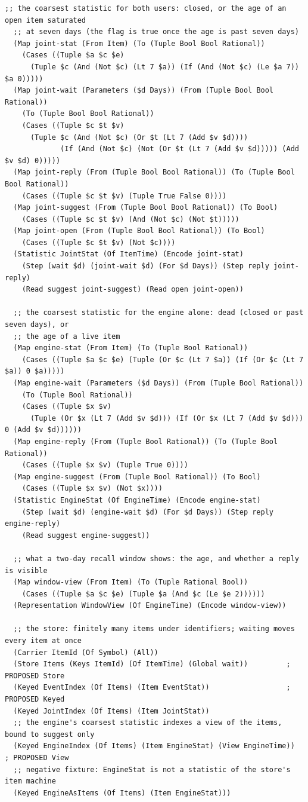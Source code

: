 \documentclass[11pt]{article}
\theoremstyle{definition}
\theoremstyle{plain}
\begin{document}
\begin{lstlisting}[style=mettamod]
  ;; the coarsest statistic for both users: closed, or the age of an open item saturated
  ;; at seven days (the flag is true once the age is past seven days)
  (Map joint-stat (From Item) (To (Tuple Bool Bool Rational))
    (Cases ((Tuple $a $c $e)
      (Tuple $c (And (Not $c) (Lt 7 $a)) (If (And (Not $c) (Le $a 7)) $a 0)))))
  (Map joint-wait (Parameters ($d Days)) (From (Tuple Bool Bool Rational))
    (To (Tuple Bool Bool Rational))
    (Cases ((Tuple $c $t $v)
      (Tuple $c (And (Not $c) (Or $t (Lt 7 (Add $v $d))))
             (If (And (Not $c) (Not (Or $t (Lt 7 (Add $v $d))))) (Add $v $d) 0)))))
  (Map joint-reply (From (Tuple Bool Bool Rational)) (To (Tuple Bool Bool Rational))
    (Cases ((Tuple $c $t $v) (Tuple True False 0))))
  (Map joint-suggest (From (Tuple Bool Bool Rational)) (To Bool)
    (Cases ((Tuple $c $t $v) (And (Not $c) (Not $t)))))
  (Map joint-open (From (Tuple Bool Bool Rational)) (To Bool)
    (Cases ((Tuple $c $t $v) (Not $c))))
  (Statistic JointStat (Of ItemTime) (Encode joint-stat)
    (Step (wait $d) (joint-wait $d) (For $d Days)) (Step reply joint-reply)
    (Read suggest joint-suggest) (Read open joint-open))

  ;; the coarsest statistic for the engine alone: dead (closed or past seven days), or
  ;; the age of a live item
  (Map engine-stat (From Item) (To (Tuple Bool Rational))
    (Cases ((Tuple $a $c $e) (Tuple (Or $c (Lt 7 $a)) (If (Or $c (Lt 7 $a)) 0 $a)))))
  (Map engine-wait (Parameters ($d Days)) (From (Tuple Bool Rational))
    (To (Tuple Bool Rational))
    (Cases ((Tuple $x $v)
      (Tuple (Or $x (Lt 7 (Add $v $d))) (If (Or $x (Lt 7 (Add $v $d))) 0 (Add $v $d))))))
  (Map engine-reply (From (Tuple Bool Rational)) (To (Tuple Bool Rational))
    (Cases ((Tuple $x $v) (Tuple True 0))))
  (Map engine-suggest (From (Tuple Bool Rational)) (To Bool)
    (Cases ((Tuple $x $v) (Not $x))))
  (Statistic EngineStat (Of EngineTime) (Encode engine-stat)
    (Step (wait $d) (engine-wait $d) (For $d Days)) (Step reply engine-reply)
    (Read suggest engine-suggest))

  ;; what a two-day recall window shows: the age, and whether a reply is visible
  (Map window-view (From Item) (To (Tuple Rational Bool))
    (Cases ((Tuple $a $c $e) (Tuple $a (And $c (Le $e 2))))))
  (Representation WindowView (Of EngineTime) (Encode window-view))

  ;; the store: finitely many items under identifiers; waiting moves every item at once
  (Carrier ItemId (Of Symbol) (All))
  (Store Items (Keys ItemId) (Of ItemTime) (Global wait))         ; PROPOSED Store
  (Keyed EventIndex (Of Items) (Item EventStat))                  ; PROPOSED Keyed
  (Keyed JointIndex (Of Items) (Item JointStat))
  ;; the engine's coarsest statistic indexes a view of the items, bound to suggest only
  (Keyed EngineIndex (Of Items) (Item EngineStat) (View EngineTime))   ; PROPOSED View
  ;; negative fixture: EngineStat is not a statistic of the store's item machine
  (Keyed EngineAsItems (Of Items) (Item EngineStat)))


\end{lstlisting}
\end{document}
